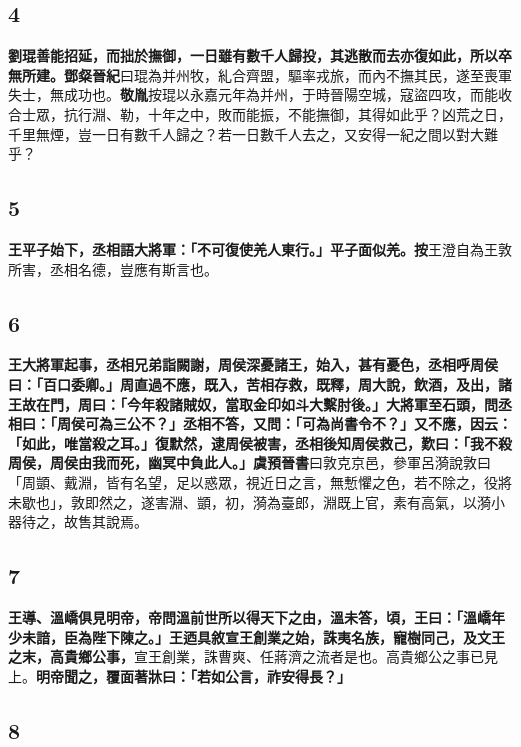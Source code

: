 \subsection*{4}

\textbf{劉琨善能招延，而拙於撫御，一日雖有數千人歸投，其逃散而去亦復如此，所以卒無所建。}{\footnotesize \textbf{鄧粲晉紀}曰琨為并州牧，糺合齊盟，驅率戎旅，而內不撫其民，遂至喪軍失士，無成功也。\textbf{敬胤}按琨以永嘉元年為并州，于時晉陽空城，寇盜四攻，而能收合士眾，抗行淵、勒，十年之中，敗而能振，不能撫御，其得如此乎？凶荒之日，千里無煙，豈一日有數千人歸之？若一日數千人去之，又安得一紀之間以對大難乎？}

\subsection*{5}

\textbf{王平子始下，丞相語大將軍：「不可復使羌人東行。」平子面似羌。}{\footnotesize \textbf{按}王澄自為王敦所害，丞相名德，豈應有斯言也。}

\subsection*{6}

\textbf{王大將軍起事，丞相兄弟詣闕謝，周侯深憂諸王，始入，甚有憂色，丞相呼周侯曰：「百口委卿。」周直過不應，既入，苦相存救，既釋，周大說，飲酒，及出，諸王故在門，周曰：「今年殺諸賊奴，當取金印如斗大繫肘後。」大將軍至石頭，問丞相曰：「周侯可為三公不？」丞相不答，又問：「可為尚書令不？」又不應，因云：「如此，唯當殺之耳。」復默然，逮周侯被害，丞相後知周侯救己，歎曰：「我不殺周侯，周侯由我而死，幽冥中負此人。」}{\footnotesize \textbf{虞預晉書}曰敦克京邑，參軍呂漪說敦曰「周顗、戴淵，皆有名望，足以惑眾，視近日之言，無慙懼之色，若不除之，役將未歇也」，敦即然之，遂害淵、顗，初，漪為臺郎，淵既上官，素有高氣，以漪小器待之，故售其說焉。}

\subsection*{7}

\textbf{王導、溫嶠俱見明帝，帝問溫前世所以得天下之由，溫未答，頃，王曰：「溫嶠年少未諳，臣為陛下陳之。」王迺具敘宣王創業之始，誅夷名族，寵樹同己，及文王之末，高貴鄉公事，}{\footnotesize 宣王創業，誅曹爽、任蔣濟之流者是也。高貴鄉公之事已見上。}\textbf{明帝聞之，覆面著牀曰：「若如公言，祚安得長？」}

\subsection*{8}

